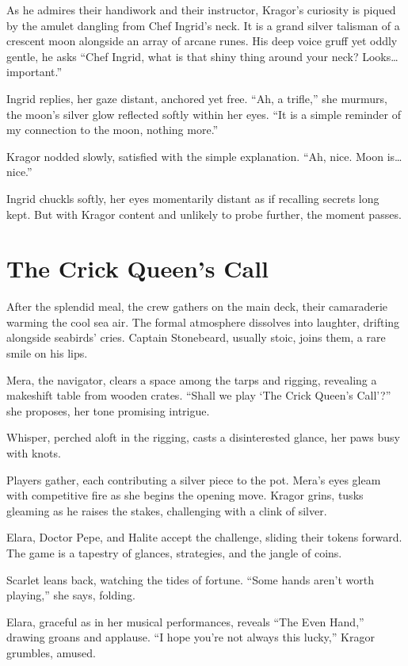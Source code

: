 \documentclass[
  letterpaper,12pt,twoside,twocolumn,openany,
  nodeprecatedcode,bg=full]{dndbook}
\begin{document}
As he admires their handiwork and their instructor, Kragor's curiosity
is piqued by the amulet dangling from Chef Ingrid's neck. It is a grand
silver talisman of a crescent moon alongside an array of arcane runes.
His deep voice gruff yet oddly gentle, he asks ``Chef Ingrid, what is
that shiny thing around your neck? Looks\ldots{} important.''

Ingrid replies, her gaze distant, anchored yet free. ``Ah, a trifle,''
she murmurs, the moon's silver glow reflected softly within her eyes.
``It is a simple reminder of my connection to the moon, nothing more.''

Kragor nodded slowly, satisfied with the simple explanation. ``Ah, nice.
Moon is\ldots{} nice.''

Ingrid chuckls softly, her eyes momentarily distant as if recalling
secrets long kept. But with Kragor content and unlikely to probe
further, the moment passes.

\section{The Crick Queen's Call}\label{the-crick-queens-call}

After the splendid meal, the crew gathers on the main deck, their
camaraderie warming the cool sea air. The formal atmosphere dissolves
into laughter, drifting alongside seabirds' cries. Captain Stonebeard,
usually stoic, joins them, a rare smile on his lips.

Mera, the navigator, clears a space among the tarps and rigging,
revealing a makeshift table from wooden crates. ``Shall we play `The
Crick Queen's Call'?'' she proposes, her tone promising intrigue.

Whisper, perched aloft in the rigging, casts a disinterested glance, her
paws busy with knots.

Players gather, each contributing a silver piece to the pot. Mera's eyes
gleam with competitive fire as she begins the opening move. Kragor
grins, tusks gleaming as he raises the stakes, challenging with a clink
of silver.

Elara, Doctor Pepe, and Halite accept the challenge, sliding their
tokens forward. The game is a tapestry of glances, strategies, and the
jangle of coins.

Scarlet leans back, watching the tides of fortune. ``Some hands aren't
worth playing,'' she says, folding.

Elara, graceful as in her musical performances, reveals ``The Even
Hand,'' drawing groans and applause. ``I hope you're not always this
lucky,'' Kragor grumbles, amused.
\end{document}

